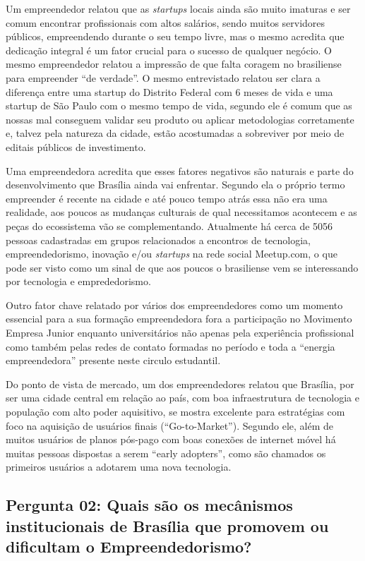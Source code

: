 Um empreendedor relatou que as \textit{startups} locais ainda são muito imaturas e ser comum encontrar profissionais com altos salários, sendo muitos servidores públicos, empreendendo durante o seu tempo livre, mas o mesmo acredita que dedicação integral é um fator crucial para o sucesso de qualquer negócio. O mesmo empreendedor relatou a impressão de que falta coragem no brasiliense para empreender ``de verdade''. O mesmo entrevistado relatou ser clara a diferença entre uma startup do Distrito Federal com 6 meses de vida e uma startup de São Paulo com o mesmo tempo de vida, segundo ele é comum que as nossas mal conseguem validar seu produto ou aplicar metodologias corretamente e, talvez pela natureza da cidade, estão acostumadas a sobreviver por meio de editais públicos de investimento.

Uma empreendedora acredita que esses fatores negativos são naturais e parte do desenvolvimento que Brasília ainda vai enfrentar. Segundo ela o próprio termo empreender é recente na cidade e até pouco tempo atrás essa não era uma realidade, aos poucos as mudanças culturais de qual necessitamos acontecem e as peças do ecossistema vão se complementando. Atualmente há cerca de 5056 pessoas cadastradas em grupos relacionados a encontros de tecnologia, empreendedorismo, inovação e/ou \textit{startups} na rede social Meetup.com, o que pode ser visto como um sinal de que aos poucos o brasiliense vem se interessando por tecnologia e emprededorismo.

Outro fator chave relatado por vários dos empreendedores como um momento essencial para a sua formação empreendedora fora a participação no Movimento Empresa Junior enquanto universitários não apenas pela experiência profissional como também pelas redes de contato formadas no período e toda a ``energia empreendedora'' presente neste circulo estudantil. 

Do ponto de vista de mercado, um dos empreendedores relatou que Brasília, por ser uma cidade central em relação ao país, com boa infraestrutura de tecnologia e população com alto poder aquisitivo, se mostra excelente para estratégias com foco na aquisição de usuários finais (``Go-to-Market''). Segundo ele, além de muitos usuários de planos pós-pago com boas conexões de internet móvel há muitas pessoas dispostas a serem ``early adopters'', como são chamados os primeiros usuários a adotarem uma nova tecnologia.

\subsection*{Pergunta 02: Quais são os mecânismos institucionais de Brasília que promovem ou dificultam o Empreendedorismo?}
\label{subsection:pergunta_de_pesquisa_2}


